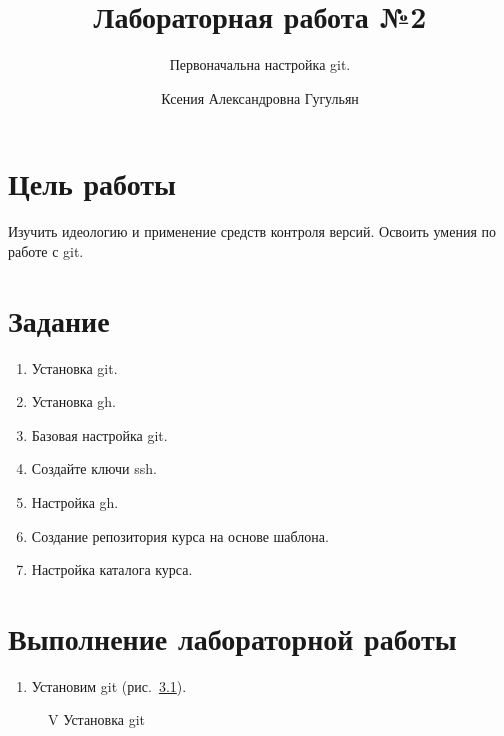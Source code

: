\documentclass[
  english,
  russian,
  12pt,
  a4paper,
  DIV=11,
  numbers=noendperiod]{scrreprt}
\title{Лабораторная работа №2}
\subtitle{Первоначальна настройка git.}
\author{Ксения Александровна Гугульян}
\date{}
\providecommand{\tightlist}{%
  \setlength{\itemsep}{0pt}\setlength{\parskip}{0pt}}
\renewcommand*\contentsname{Содержание}
\newcommand\contentsname{Содержание}
\begin{document}
\maketitle

\renewcommand*\contentsname{Содержание}
{
\setcounter{tocdepth}{1}
\tableofcontents
}
\listoffigures
\listoftables

\chapter{Цель
работы}\label{ux446ux435ux43bux44c-ux440ux430ux431ux43eux442ux44b}

Изучить идеологию и применение средств контроля версий. Освоить умения
по работе с git.

\chapter{Задание}\label{ux437ux430ux434ux430ux43dux438ux435}

\begin{enumerate}
\def\labelenumi{\arabic{enumi})}
\tightlist
\item
  Установка git.
\item
  Установка gh.
\item
  Базовая настройка git.
\item
  Создайте ключи ssh.
\item
  Настройка gh.
\item
  Создание репозитория курса на основе шаблона.
\item
  Настройка каталога курса.
\end{enumerate}

\chapter{Выполнение лабораторной
работы}\label{ux432ux44bux43fux43eux43bux43dux435ux43dux438ux435-ux43bux430ux431ux43eux440ux430ux442ux43eux440ux43dux43eux439-ux440ux430ux431ux43eux442ux44b}

\begin{enumerate}
\def\labelenumi{\arabic{enumi})}
\tightlist
\item
  Установим git (рис.~\ref{fig-001}).
\end{enumerate}

\begin{figure}


\caption{\label{fig-001}V Установка git}

\end{figure}%
\end{document}
